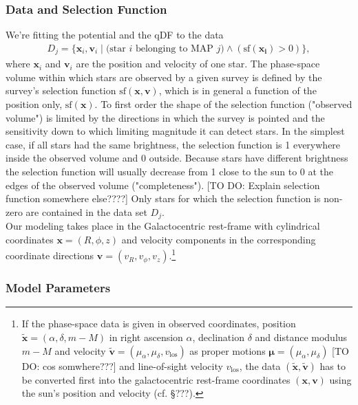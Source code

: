 \documentclass[12pt,preprint]{aastex}
\newcommand{\vect}[1]{\boldsymbol{#1}} %
\begin{document}
\subsubsection{Data and Selection Function} 

We're fitting the potential and the qDF to the data
\begin{eqnarray*}
D_j  =\{ \vect{x}_i,\vect{v}_i \mid \text{(star $i$ belonging to MAP $j$)} \wedge (\text{sf}(\vect{x_i}) > 0) \},
\end{eqnarray*}
where  $\vect{x}_i$ and $\vect{v}_i$ are the position and velocity of one star. The phase-space volume within which stars are observed by a given survey is defined by the survey's selection function $\text{sf}(\vect{x},\vect{v})$, which is in general a function of the position only, $\text{sf}(\vect{x})$. To first order the shape of the selection function ("observed volume") is limited by the directions in which the survey is pointed and the sensitivity down to which limiting magnitude it can detect stars. In the simplest case, if all stars had the same brightness, the selection function is 1 everywhere inside the observed volume and 0 outside. Because stars have different brightness the selection function will usually decrease from 1 close to the sun to 0 at the edges of the observed volume ("completeness"). [TO DO: Explain selection function somewhere else????] Only stars for which the selection function is non-zero are contained in the data set $D_j$.
\\Our modeling takes place in the Galactocentric rest-frame with cylindrical coordinates $\vect{x} = (R,\phi,z)$ and velocity components in the corresponding coordinate directions $\vect{v} = (v_R,v_\phi,v_z)$.\footnote{If the phase-space data is given in observed coordinates, position $\tilde{\vect{x}}=(\alpha,\delta,m-M)$ in right ascension $\alpha$, declination $\delta$ and distance modulus $m-M$ and velocity $\tilde{\vect{v}} = (\mu_\alpha,\mu_\delta,v_\text{los})$ as proper motions $\vect{\mu}=(\mu_\alpha,\mu_\delta)$ [TO DO: cos somwhere???] and line-of-sight velocity $v_\text{los}$, the data $(\tilde{\vect{x}},\tilde{\vect{v}})$ has to be converted first into the galactocentric rest-frame coordinates $(\vect{x},\vect{v})$ using the sun's position and velocity (cf. \S ???).}

\subsubsection{Model Parameters} 
\end{document}
